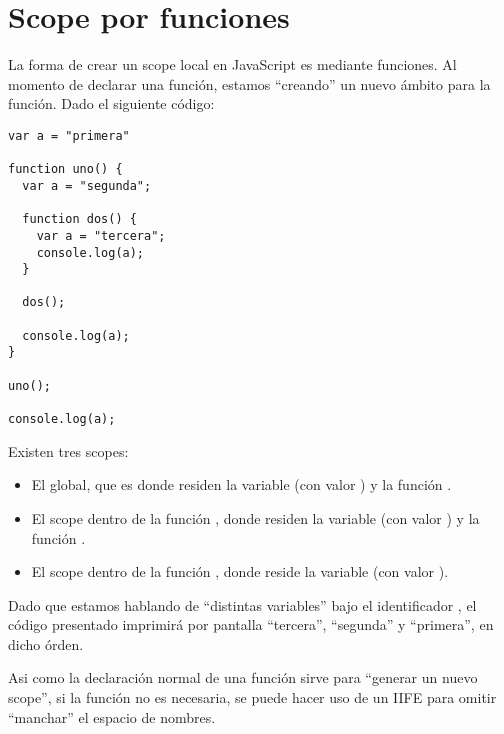 \section{Scope por funciones}
\label{sec:scopefunciones}

La forma de crear un scope local en JavaScript es mediante funciones. Al momento de declarar una función, estamos "`creando"' un nuevo ámbito para la función. Dado el siguiente código:

\begin{lstlisting}
var a = "primera"

function uno() {
  var a = "segunda";

  function dos() {
    var a = "tercera";
    console.log(a);
  }

  dos();

  console.log(a);
}

uno();

console.log(a);
\end{lstlisting}

Existen tres scopes: 
\begin{itemize} 
\item El global, que es donde residen la variable  (con valor ) y la función .
\item El scope dentro de la función , donde residen la variable  (con valor ) y la función .
\item El scope dentro de la función , donde reside la variable  (con valor ).
\end{itemize}

Dado que estamos hablando de "`distintas variables"' bajo el identificador , el código presentado imprimirá por pantalla "`tercera"', "`segunda"' y "`primera"', en dicho órden.

Asi como la declaración normal de una función sirve para "`generar un nuevo scope"', si la función no es necesaria, se puede hacer uso de un IIFE para omitir "`manchar"' el espacio de nombres.